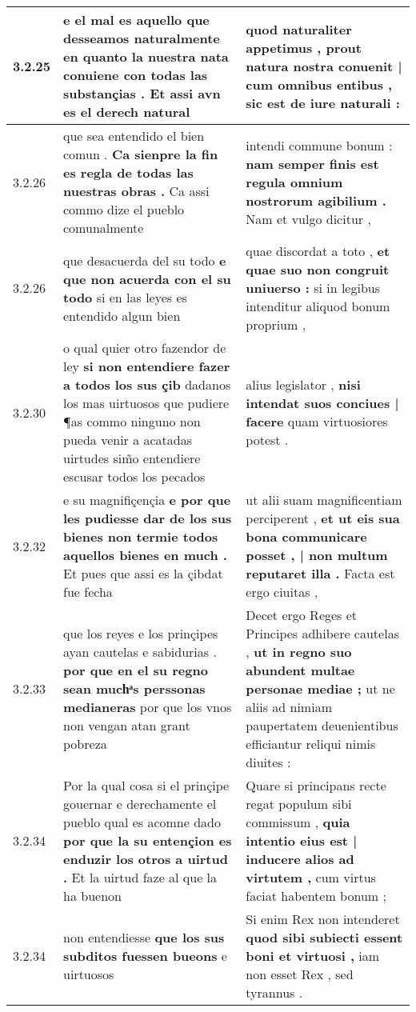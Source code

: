 \begin{tabular}{|p{1cm}|p{6.5cm}|p{6.5cm}|}
3.2.25 & e el mal es aquello que desseamos naturalmente \textbf{ en quanto la nuestra nata conuiene con todas las substançias . } Et assi avn es el derech natural & quod naturaliter appetimus , \textbf{ prout natura nostra conuenit | cum omnibus entibus , } sic est de iure naturali : \\\hline
3.2.26 & que sea entendido el bien comun . \textbf{ Ca sienpre la fin es regla de todas las nuestras obras . } Ca assi commo dize el pueblo comunalmente & intendi commune bonum : \textbf{ nam semper finis est regula omnium nostrorum agibilium . } Nam et vulgo dicitur , \\\hline
3.2.26 & que desacuerda del su todo \textbf{ e que non acuerda con el su todo } si en las leyes es entendido algun bien & quae discordat a toto , \textbf{ et quae suo non congruit uniuerso : } si in legibus intenditur aliquod bonum proprium , \\\hline
3.2.30 & o qual quier otro fazendor de ley \textbf{ si non entendiere fazer a todos los sus çib } dadanos los mas uirtuosos que pudiere ¶as commo ninguno non pueda venir a acatadas uirtudes sim̃o entendiere escusar todos los pecados & alius legislator , \textbf{ nisi intendat suos conciues | facere } quam virtuosiores potest . \\\hline
3.2.32 & e su magnifiçençia \textbf{ e por que les pudiesse dar de los sus bienes non termie todos aquellos bienes en much . } Et pues que assi es la çibdat fue fecha & ut alii suam magnificentiam perciperent , \textbf{ et ut eis sua bona communicare posset , | non multum reputaret illa . } Facta est ergo ciuitas , \\\hline
3.2.33 & que los reyes e los prinçipes ayan cautelas e sabidurias . \textbf{ por que en el su regno sean muchͣs perssonas medianeras } por que los vnos non vengan atan grant pobreza & Decet ergo Reges et Principes adhibere cautelas , \textbf{ ut in regno suo abundent multae personae mediae ; } ut ne aliis ad nimiam paupertatem deuenientibus efficiantur reliqui nimis diuites : \\\hline
3.2.34 & Por la qual cosa si el prinçipe gouernar e derechamente el pueblo qual es acomne dado \textbf{ por que la su entençion es enduzir los otros a uirtud . } Et la uirtud faze al que la ha buenon & Quare si principans recte regat populum sibi commissum , \textbf{ quia intentio eius est | inducere alios ad virtutem , } cum virtus faciat habentem bonum ; \\\hline
3.2.34 & non entendiesse \textbf{ que los sus subditos fuessen bueons } e uirtuosos & Si enim Rex non intenderet \textbf{ quod sibi subiecti essent boni et virtuosi , } iam non esset Rex , sed tyrannus . \\\hline

\end{tabular}
